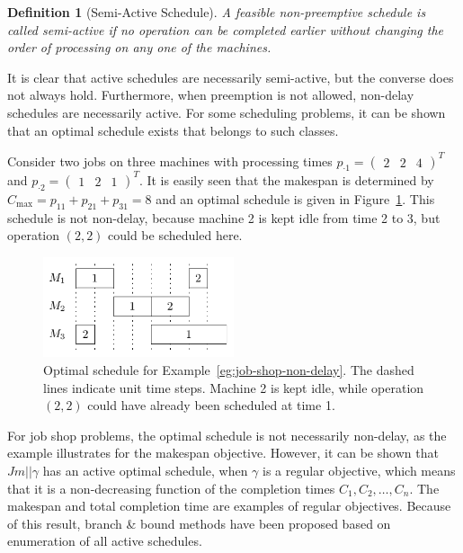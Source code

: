 \documentclass{article}
\theoremstyle{definition}
\theoremstyle{plain}
\newtheorem{define}{Definition}[section]
\begin{document}
\begin{define}[Semi-Active Schedule]
A feasible non-preemptive schedule is called
semi-active if no operation can be completed earlier without changing the order
of processing on any one of the machines.
\end{define}

It is clear that active schedules are necessarily semi-active, but the converse
does not always hold. Furthermore, when preemption is not allowed, non-delay
schedules are necessarily active. For some scheduling problems, it can be shown
that an optimal schedule exists that belongs to such classes.

\begin{eg}
  \label{eg:job-shop-non-delay}
  Consider two jobs on three machines with processing times
  $p_{\cdot 1} = \begin{pmatrix} 2 & 2 & 4 \end{pmatrix}^T$ and
  $p_{\cdot 2} = \begin{pmatrix} 1 & 2 & 1 \end{pmatrix}^T$. It is easily seen
  that the makespan is determined by
  $C_\text{max} = p_{11} + p_{21} + p_{31} = 8$ and an optimal schedule is given
  in Figure~\ref{fig:job-shop-delay}. This schedule is not non-delay, because
  machine 2 is kept idle from time 2 to 3, but operation $(2,2)$ could be
  scheduled here.
\end{eg}

\begin{figure}
  \centering
  \includegraphics[width=0.5\textwidth]{figures/job-shop-delay.pdf}
  \caption{Optimal schedule for Example~\ref{eg:job-shop-non-delay}. The dashed
    lines indicate unit time steps. Machine 2 is kept idle, while operation
    $(2,2)$ could have already been scheduled at time 1.}
  \label{fig:job-shop-delay}
\end{figure}

For job shop problems, the optimal schedule is not necessarily non-delay, as the
example illustrates for the makespan objective. However, it can be
shown that $Jm || \gamma$ has an active optimal schedule, when $\gamma$ is a
regular objective, which means that it is a non-decreasing function of the
completion times $C_1, C_2, \dots, C_n$. The makespan and total completion time
are examples of regular objectives. Because of this result, branch \& bound
methods have been proposed based on enumeration of all active schedules.
\end{document}
